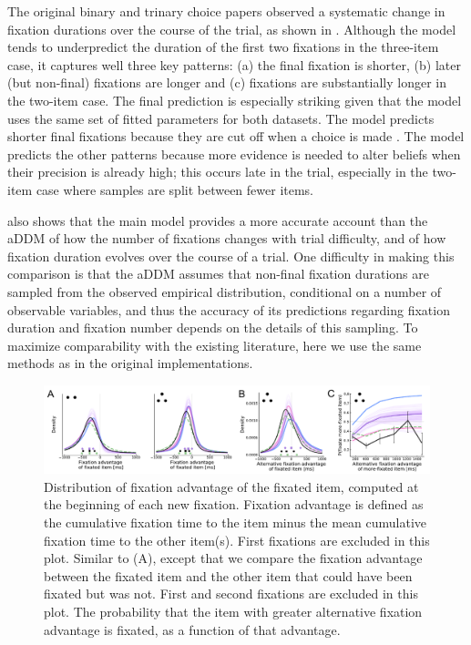 The original binary and trinary choice papers observed a systematic change in fixation durations over the course of the trial, as shown in . Although the model tends to underpredict the duration of the first two fixations in the three-item case, it captures well three key patterns: (a) the final fixation is shorter, (b) later (but non-final) fixations are longer and (c) fixations are substantially longer in the two-item case. The final prediction is especially striking given that the model uses the same set of fitted parameters for both datasets. The model predicts shorter final fixations because they are cut off when a choice is made \citep{krajbich2010visual}. The model predicts the other patterns because more evidence is needed to alter beliefs when their precision is already high; this occurs late in the trial, especially in the two-item case where samples are split between fewer items.

 also shows that the main model provides a more accurate account than the aDDM of how the number of fixations changes with trial difficulty, and of how fixation duration evolves over the course of a trial. One difficulty in making this comparison is that the aDDM assumes that non-final fixation durations are sampled from the observed empirical distribution, conditional on a number of observable variables, and thus the accuracy of its predictions regarding fixation duration and fixation number depends on the details of this sampling. To maximize comparability with the existing literature, here we use the same methods as in the original implementations.

\begin{figure}[ht!]
  \centering
  \includegraphics[width=\textwidth]{figs/attention/Fig5.pdf}
  \caption{
     Distribution of fixation advantage of the fixated item, computed at the beginning of each new fixation. Fixation advantage is defined as the cumulative fixation time to the item  minus the mean cumulative fixation time to the other item(s). First fixations are excluded in this plot.
     Similar to (A), except that we compare the fixation advantage between the fixated item and the other item that could have been fixated but was not. First and second fixations are excluded in this plot.
     The probability that the item with greater alternative fixation advantage is fixated, as a function of that advantage.
}
  \label{fig:attention5}
\end{figure}

